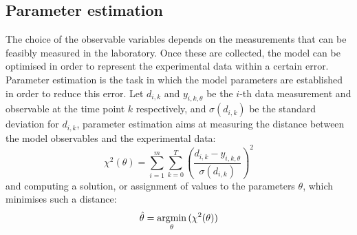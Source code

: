\subsection{Parameter estimation}
\label{subsec:Parameter estimation}
The choice of the observable variables depends on the measurements that can be feasibly measured in the laboratory. Once these  are collected, the model can be optimised in order to represent the experimental data within a certain error. Parameter estimation is the task in which the model parameters are established in order to reduce this error. Let ${d}_{i,k}$ and 
$y_{i,k,\theta}$ be the $i$-th data measurement and observable at the time point $k$ respectively, and $\sigma(d_{i,k})$ be the standard deviation for $d_{i,k}$, parameter estimation aims at measuring the distance between the model observables and the experimental data:
\begin{equation}
  \label{eq:chi_square}
  \chi^{2}(\theta) = \sum_{i=1}^{m} \sum_{k=0}^{T} \left(\frac{d_{i,k} - y_{i,k,\theta}}{\sigma(d_{i,k})}\right)^{2}
\end{equation}
and computing a solution, or assignment of values to the parameters $\theta$, which minimises such a distance:
\begin{equation}
  \label{eq:hat_theta}
  \hat{\theta} = \argmin_\theta {(\chi^{2}(\theta))} 
\end{equation}
